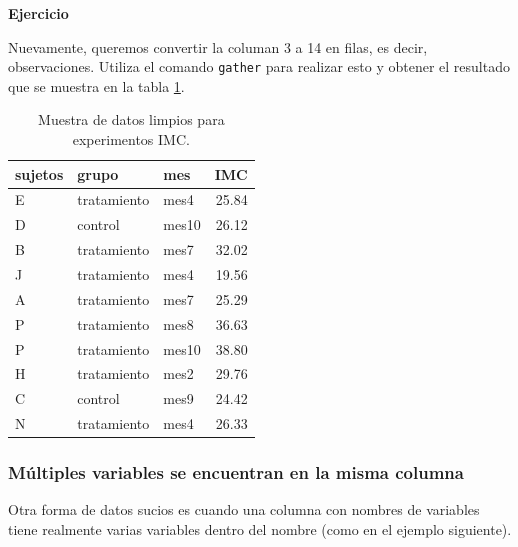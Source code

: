 \documentclass[]{article}
\begin{document}
\textbf{Ejercicio}

Nuevamente, queremos convertir la columan 3 a 14 en filas, es decir,
observaciones. Utiliza el comando \texttt{gather} para realizar esto y
obtener el resultado que se muestra en la tabla \ref{tab:sujetostidy}.

\begin{table}[ht]
\centering
\begin{tabular}{lllr}
  \hline
sujetos & grupo & mes & IMC \\ 
  \hline
E & tratamiento & mes4 & 25.84 \\ 
  D & control & mes10 & 26.12 \\ 
  B & tratamiento & mes7 & 32.02 \\ 
  J & tratamiento & mes4 & 19.56 \\ 
  A & tratamiento & mes7 & 25.29 \\ 
  P & tratamiento & mes8 & 36.63 \\ 
  P & tratamiento & mes10 & 38.80 \\ 
  H & tratamiento & mes2 & 29.76 \\ 
  C & control & mes9 & 24.42 \\ 
  N & tratamiento & mes4 & 26.33 \\ 
   \hline
\end{tabular}
\caption{Muestra de datos limpios para experimentos IMC.} 
\label{tab:sujetostidy}
\end{table}

\subsubsection{Múltiples variables se encuentran en la misma
columna}\label{multiples-variables-se-encuentran-en-la-misma-columna}

Otra forma de datos sucios es cuando una columna con nombres de
variables tiene realmente varias variables dentro del nombre (como en el
ejemplo siguiente).
\end{document}
